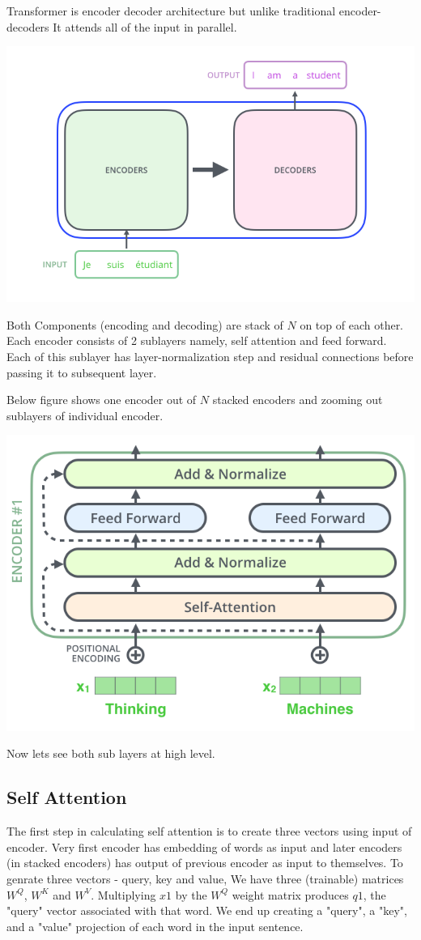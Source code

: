 \documentclass{article}
\begin{document}
\begin{multicols}{2}
Transformer is encoder decoder architecture but unlike traditional encoder-decoders It attends all of the input in parallel.

\begin{center}
        \captionsetup{type=figure}
        \includegraphics[width=.40\textwidth]{2.png}
\end{center}

Both Components (encoding and decoding) are stack of $N$ on top of each other. Each encoder consists of 2 sublayers namely, self attention and feed forward. Each of this sublayer has  layer-normalization step and residual connections before passing it to subsequent layer.

Below figure shows one encoder out of $N$ stacked encoders and zooming out sublayers of individual encoder.

\begin{center}
        \captionsetup{type=figure}
        \includegraphics[width=.40\textwidth]{EncoderSublayer.png}
\end{center}


Now lets see both sub layers at high level.
 \subsection{Self Attention}
 The first step in calculating self attention is to create three vectors using input of encoder. Very first encoder has embedding of words as input and later encoders (in stacked encoders) has output of previous encoder as input to themselves. To genrate three vectors - query, key and value, We have three (trainable) matrices $W^Q$, $W^K$ and  $W^V$.
 Multiplying $x1$ by the $W^Q$ weight matrix produces $q1$, the "query" vector associated with that word. We end up creating a "query", a "key", and a "value" projection of each word in the input sentence.


\end{multicols}
\end{document}
